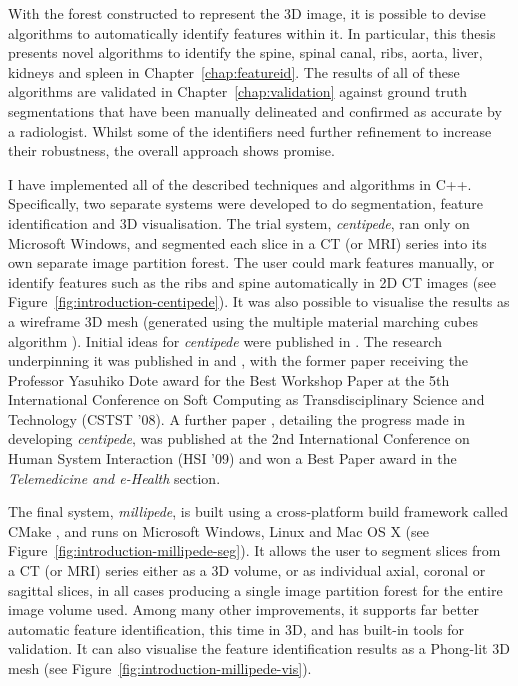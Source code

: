 With the forest constructed to represent the 3D image, it is possible to devise algorithms to automatically identify features within it. In particular, this thesis presents novel algorithms to identify the spine, spinal canal, ribs, aorta, liver, kidneys and spleen in Chapter~\ref{chap:featureid}. The results of all of these algorithms are validated in Chapter~\ref{chap:validation} against ground truth segmentations that have been manually delineated and confirmed as accurate by a radiologist. Whilst some of the identifiers need further refinement to increase their robustness, the overall approach shows promise.


I have implemented all of the described techniques and algorithms in C++. Specifically, two separate systems were developed to do segmentation, feature identification and 3D visualisation. The trial system, \emph{centipede}, ran only on Microsoft Windows, and segmented each slice in a CT (or MRI) series into its own separate image partition forest. The user could mark features manually, or identify features such as the ribs and spine automatically in 2D CT images (see Figure~\ref{fig:introduction-centipede}). It was also possible to visualise the results as a wireframe 3D mesh (generated using the multiple material marching cubes algorithm \cite{wu03}). Initial ideas for \emph{centipede} were published in \cite{gvcfbit07}. The research underpinning it was published in \cite{gvccimi08} and \cite{gvcispa09}, with the former paper receiving the Professor Yasuhiko Dote award for the Best Workshop Paper at the 5th International Conference on Soft Computing as Transdisciplinary Science and Technology (CSTST '08). A further paper \cite{gvchsi09}, detailing the progress made in developing \emph{centipede}, was published at the 2nd International Conference on Human System Interaction (HSI '09) and won a Best Paper award in the \emph{Telemedicine and e-Health} section.

The final system, \emph{millipede}, is built using a cross-platform build framework called CMake \cite{cmake}, and runs on Microsoft Windows, Linux and Mac OS X (see Figure~\ref{fig:introduction-millipede-seg}). It allows the user to segment slices from a CT (or MRI) series either as a 3D volume, or as individual axial, coronal or sagittal slices, in all cases producing a single image partition forest for the entire image volume used. Among many other improvements, it supports far better automatic feature identification, this time in 3D, and has built-in tools for validation. It can also visualise the feature identification results as a Phong-lit 3D mesh (see Figure~\ref{fig:introduction-millipede-vis}).

